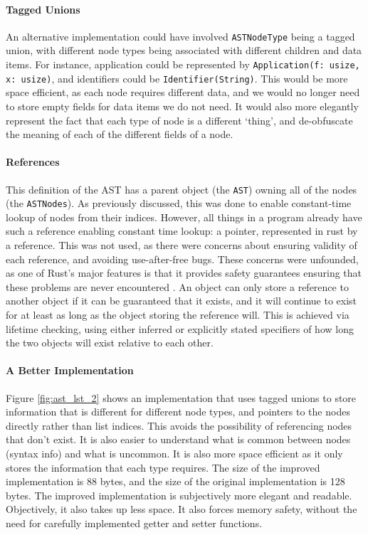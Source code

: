 \paragraph{Tagged Unions}
An alternative implementation could have involved \verb|ASTNodeType| being a tagged union, with different node types being associated with different children and data items. For instance, application could be represented by \verb|Application(f: usize, x: usize)|, and identifiers could be \verb|Identifier(String)|. This would be more space efficient, as each node requires different data, and we would no longer need to store empty fields for data items we do not need. It would also more elegantly represent the fact that each type of node is a different `thing', and de-obfuscate the meaning of each of the different fields of a node. 

\paragraph{References}
This definition of the \ac{AST} has a parent object (the \verb|AST|) owning all of the nodes (the \verb|ASTNodes|). As previously discussed, this was done to enable constant-time lookup of nodes from their indices. However, all things in a program already have such a reference enabling constant time lookup: a pointer, represented in rust by a reference. This was not used, as there were concerns about ensuring validity of each reference, and avoiding use-after-free bugs. These concerns were unfounded, as one of Rust's major features is that it provides safety guarantees ensuring that these problems are never encountered \cite{rust_book}. An object can only store a reference to another object if it can be guaranteed that it exists, and it will continue to exist for at least as long as the object storing the reference will. This is achieved via lifetime checking, using either inferred or explicitly stated specifiers of how long the two objects will exist relative to each other. 

\paragraph{A Better Implementation}
Figure \ref{fig:ast_lst_2} shows an implementation that uses tagged unions to store information that is different for different node types, and pointers to the nodes directly rather than list indices. This avoids the possibility of referencing nodes that don't exist. It is also easier to understand what is common between nodes (syntax info) and what is uncommon. It is also more space efficient as it only stores the information that each type requires. The size of the improved implementation is 88 bytes, and the size of the original implementation is 128 bytes. The improved implementation is subjectively more elegant and readable. Objectively, it also takes up less space. It also forces memory safety, without the need for carefully implemented getter and setter functions. 


